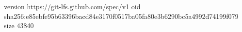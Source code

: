 version https://git-lfs.github.com/spec/v1
oid sha256:e85ebfe95b63396bacd84e3170f0517ba05fa80e3b6290bc5a4992d74199f079
size 43840
